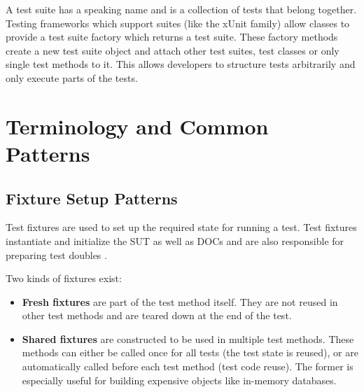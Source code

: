         A test suite has a speaking name and is a collection of tests that belong together.
        Testing frameworks which support suites (like the xUnit family) allow classes to provide a test suite factory which returns a test suite.
        These factory methods create a new test suite object and attach other test suites, test classes or only single test methods to it.
        This allows developers to structure tests arbitrarily and only execute parts of the tests.



\section{Terminology and Common Patterns} \label{sec:TerminologyAndPatterns}

    \subsection{Fixture Setup Patterns} \label{subsec:FixtureSetupPatterns}
        Test fixtures are used to set up the required state for running a test.
        Test fixtures instantiate and initialize the SUT as well as DOCs and are also responsible for preparing test doubles .

       Two kinds of fixtures exist:
        \begin{itemize}
            \item \textbf{Fresh fixtures}
                    are part of the test method itself. They are not reused in other test methods and are teared down at the end of the test.
            \item \textbf{Shared fixtures}
                    are constructed to be used in multiple test methods.
                    These methods can either be called once for all tests (the test state is reused),
                    or are automatically called before each test method (test code reuse).
                    The former is especially useful for building expensive objects like in-memory databases.
        \end{itemize}

